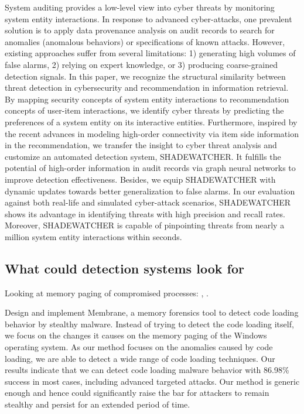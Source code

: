 \documentclass{article}
\begin{document}
System auditing provides a low-level view into cyber threats by monitoring system entity interactions. In response to advanced cyber-attacks, one prevalent solution is to apply data provenance analysis on audit records to search for anomalies (anomalous behaviors) or specifications of known attacks. However, existing approaches suffer from several limitations: 1) generating high volumes of false alarms, 2) relying on expert knowledge, or 3) producing coarse-grained detection signals. In this paper, we recognize the structural similarity between threat detection in cybersecurity and recommendation in information retrieval. By mapping security concepts of system entity interactions to recommendation concepts of user-item interactions, we identify cyber threats by predicting the preferences of a system entity on its interactive entities. Furthermore, inspired by the recent advances in modeling high-order connectivity via item side information in the recommendation, we transfer the insight to cyber threat analysis and customize an automated detection system, SHADEWATCHER. It fulfills the potential of high-order information in audit records via graph neural networks to improve detection effectiveness. Besides, we equip SHADEWATCHER with dynamic updates towards better generalization to false alarms. In our evaluation against both real-life and simulated cyber-attack scenarios, SHADEWATCHER shows its advantage in identifying threats with high precision and recall rates. Moreover, SHADEWATCHER is capable of pinpointing threats from nearly a million system entity interactions within seconds.


\subsection{What could detection systems look for}

Looking at memory paging of compromised processes: , \autocite{Pek:2016}.

Design and implement Membrane, a memory forensics tool to detect code loading behavior by stealthy malware. Instead of trying to detect the code loading itself, we focus on the changes it causes on the memory paging of the Windows operating system. As our method focuses on the anomalies caused by code loading, we are able to detect a wide range of code loading techniques. Our results indicate that we can detect code loading malware behavior with 86.98\% success in most cases, including advanced targeted attacks. Our method is generic enough and hence could significantly raise the bar for attackers to remain stealthy and persist for an extended period of time.
\end{document}
